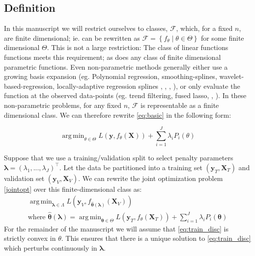 \documentclass[10pt,letterpaper]{article}
\DeclareMathOperator*{\argmin}{arg\,min}
\begin{document}
\subsection{Definition}
In this manuscript we will restrict ourselves to classes, $\mathcal{F}$, which, for a fixed $n$, are finite dimensional; ie. can be rewritten as $\mathcal{F} = \left\{f_{\theta}\middle|\theta\in\Theta\right\}$ for some finite dimensional $\Theta$. This is not a large restriction: The class of linear functions functions meets this requirement; as does any class of finite dimensional parametric functions. Even non-parametric methods generally either use a growing basis expansion (eg. Polynomial regression, smoothing-splines, wavelet-based-regression, locally-adaptive regression splines \citep{tsybakov2008introduction}, \citep{wahba1981spline}, \citep{donoho1994ideal}, \citep{mammen1997locally}), or only evaluate the function at the observed data-points (eg. trend filtering, fused lasso, \citep{kim2009ell_1}, \citep{tibshirani2005sparsity}). In these non-parametric problems, for any fixed $n$, $\mathcal{F}$ is representable as a finite dimensional class.
We can therefore rewrite \eqref{eq:basic} in the following form:

\begin{equation}\label{eq:train_disc}
\argmin_{\theta \in \Theta} L(\boldsymbol{y}, f_\theta(\boldsymbol{X})) + \sum\limits_{i=1}^J \lambda_i P_i(\theta)
\end{equation}

Suppose that we use a training/validation split to select penalty parameters $\boldsymbol{\lambda} = (\lambda_1, ..., \lambda_J)^\top$. Let the data be partitioned into a training set $(\boldsymbol{y}_T , \boldsymbol{X}_T)$ and validation set $(\boldsymbol{y}_V, \boldsymbol{X}_V)$. We can rewrite the joint optimization problem \eqref{jointopt} over this finite-dimensional class as:
\begin{equation}
\begin{array}{c}
\argmin_{\boldsymbol{\lambda} \in \Lambda} L(\boldsymbol{y}_V, f_{\hat{\boldsymbol \theta}(\boldsymbol{\lambda})}(\boldsymbol{X}_V)) \\
\text{where } {\hat{\boldsymbol \theta}(\boldsymbol{\lambda})} = \argmin_{\boldsymbol \theta \in \Theta} L(\boldsymbol{y}_T, f_\theta (\boldsymbol{X}_T)) + \sum\limits_{i=1}^J \lambda_i P_i(\boldsymbol \theta)
\end{array}
\label{jointopt2}
\end{equation}
For the remainder of the manuscript we will assume that \eqref{eq:train_disc} is strictly convex in $\theta$. This ensures that there is a unique solution to \eqref{eq:train_disc} which perturbs continuously in $\boldsymbol{\lambda}$.
\end{document}
